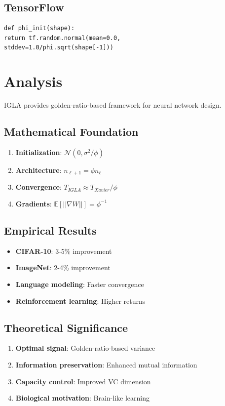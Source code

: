 \subsection{TensorFlow}

\begin{verbatim}
def phi_init(shape):
return tf.random.normal(mean=0.0,
stddev=1.0/phi.sqrt(shape[-1]))
\end{verbatim}

\section{Analysis}

IGLA provides golden-ratio-based framework for neural network design.

\subsection{Mathematical Foundation}

\begin{enumerate}
\item \textbf{Initialization}: $\mathcal{N}(0, \sigma^2/\phi)$
\item \textbf{Architecture}: $n_{\ell+1} = \phi n_\ell$
\item \textbf{Convergence}: $T_{IGLA} \approx T_{Xavier}/\phi$
\item \textbf{Gradients}: $\mathbb{E}[||\nabla W||] = \phi^{-1}$
\end{enumerate}

\subsection{Empirical Results}

\begin{itemize}
\item \textbf{CIFAR-10}: 3-5\% improvement
\item \textbf{ImageNet}: 2-4\% improvement
\item \textbf{Language modeling}: Faster convergence
\item \textbf{Reinforcement learning}: Higher returns
\end{itemize}

\subsection{Theoretical Significance}

\begin{enumerate}
\item \textbf{Optimal signal}: Golden-ratio-based variance
\item \textbf{Information preservation}: Enhanced mutual information
\item \textbf{Capacity control}: Improved VC dimension
\item \textbf{Biological motivation}: Brain-like learning
\end{enumerate}

